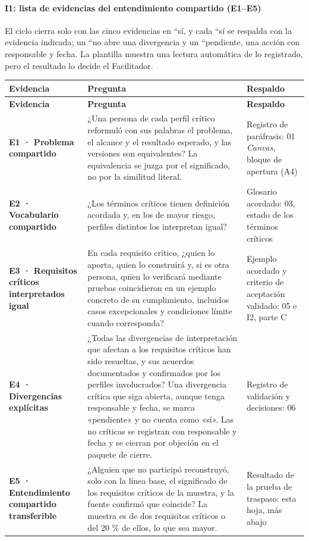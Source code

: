 \documentclass[12pt,letterpaper,oneside]{report}
\begin{document}
\paragraph{I1: lista de evidencias del entendimiento compartido (E1--E5)}
El ciclo cierra solo con las cinco evidencias en ``sí, y cada ``sí se respalda con la evidencia indicada; un ``no abre una divergencia y un ``pendiente, una acción con responsable y fecha. La plantilla muestra una lectura automática de lo registrado, pero el resultado lo decide el Facilitador.


{\scriptsize\renewcommand{\arraystretch}{1.25}\setlength{\tabcolsep}{3pt}
\begin{xltabular}{\textwidth}{@{}>{\raggedright\arraybackslash}p{0.18\textwidth}>{\raggedright\arraybackslash}X>{\raggedright\arraybackslash}p{0.27\textwidth}@{}}
\toprule
\textbf{Evidencia} & \textbf{Pregunta} & \textbf{Respaldo} \\
\midrule
\endfirsthead
\toprule
\textbf{Evidencia} & \textbf{Pregunta} & \textbf{Respaldo} \\
\midrule
\endhead
\bottomrule
\endlastfoot
\textbf{E1 · Problema compartido} & ¿Una persona de cada perfil crítico reformuló con sus palabras el problema, el alcance y el resultado esperado, y las versiones son equivalentes? La equivalencia se juzga por el significado, no por la similitud literal. & Registro de paráfrasis: 01 \textit{Canvas}, bloque de apertura (A4) \\
\textbf{E2 · Vocabulario compartido} & ¿Los términos críticos tienen definición acordada y, en los de mayor riesgo, perfiles distintos los interpretan igual? & Glosario acordado: 03, estado de los términos críticos \\
\textbf{E3 · Requisitos críticos interpretados igual} & En cada requisito crítico, ¿quien lo aporta, quien lo construirá y, si es otra persona, quien lo verificará
mediante pruebas coincidieron en un ejemplo concreto de su cumplimiento, incluidos casos excepcionales y condiciones límite cuando corresponda? & Ejemplo acordado y criterio de aceptación validado: 05 e I2, parte C \\
\textbf{E4 · Divergencias explícitas} & ¿Todas las divergencias de interpretación que afectan a los requisitos críticos han sido resueltas, y sus acuerdos documentados y confirmados por los perfiles involucrados? Una divergencia crítica que siga abierta, aunque tenga responsable y fecha, se marca «pendiente» y no cuenta como «sí». Las no críticas se registran con responsable y fecha y se cierran por objeción en el paquete de cierre. & Registro de validación y decisiones: 06 \\
\textbf{E5 · Entendimiento compartido transferible} & ¿Alguien que no participó reconstruyó, solo con la línea base, el significado de los requisitos críticos de la muestra, y la fuente confirmó que coincide? La muestra es de dos requisitos críticos o del 20 \% de ellos, lo que sea mayor. & Resultado de la prueba de traspaso: esta hoja, más abajo \\
\end{xltabular}}
\end{document}
